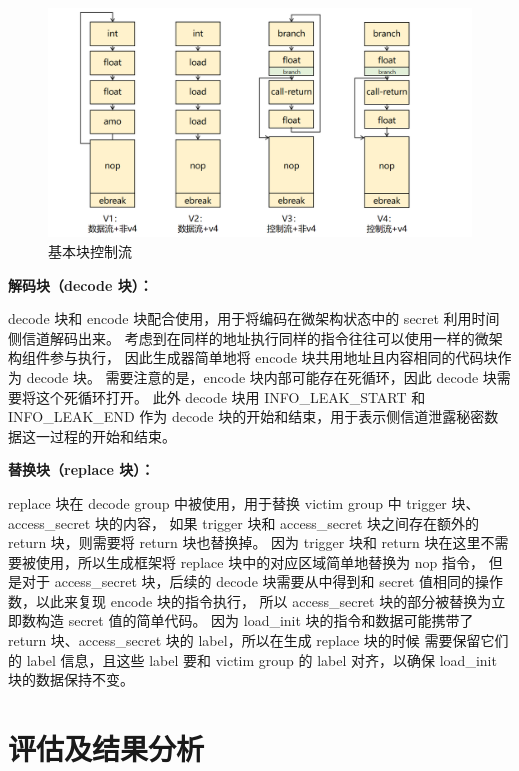\begin{figure}[!h]
    \centering
    \includegraphics[width=\linewidth]{figure/paper/encode-consist.png}
    \caption{基本块控制流}
    \label{paper:encode-consist}
\end{figure}

\textbf{解码块（decode 块）：}\par
decode 块和 encode 块配合使用，用于将编码在微架构状态中的 secret 利用时间侧信道解码出来。
考虑到在同样的地址执行同样的指令往往可以使用一样的微架构组件参与执行，
因此生成器简单地将 encode 块共用地址且内容相同的代码块作为 decode 块。
需要注意的是，encode 块内部可能存在死循环，因此 decode 块需要将这个死循环打开。
此外 decode 块用 INFO\_LEAK\_START 和 INFO\_LEAK\_END 作为
decode 块的开始和结束，用于表示侧信道泄露秘密数据这一过程的开始和结束。\par

\textbf{替换块（replace 块）：}\par
replace 块在 decode group 中被使用，用于替换 victim group 中 trigger 块、access\_secret 块的内容，
如果 trigger 块和 access\_secret 块之间存在额外的 return 块，则需要将 return 块也替换掉。
因为 trigger 块和 return 块在这里不需要被使用，所以生成框架将 replace 块中的对应区域简单地替换为 nop 指令，
但是对于 access\_secret 块，后续的 decode 块需要从中得到和 secret 值相同的操作数，以此来复现 encode 块的指令执行，
所以 access\_secret 块的部分被替换为立即数构造 secret 值的简单代码。
因为 load\_init 块的指令和数据可能携带了 return 块、access\_secret 块的 label，所以在生成 replace 块的时候
需要保留它们的 label 信息，且这些 label 要和 victim group 的 label 对齐，以确保 load\_init 块的数据保持不变。\par

\cleardoublepage
\section{评估及结果分析}

